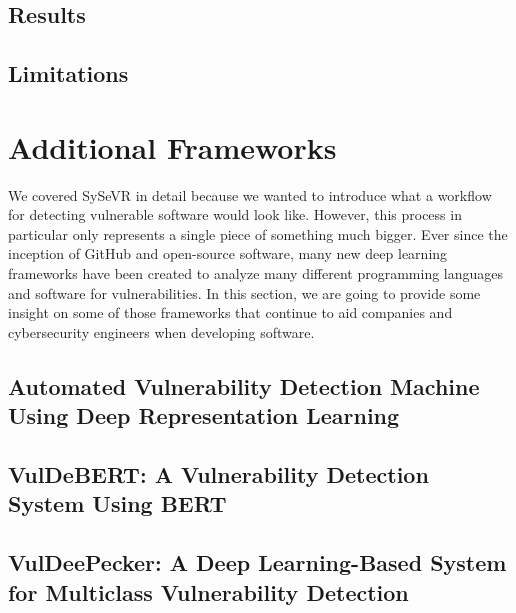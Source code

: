 \documentclass[12pt,twocolumn,letterpaper]{article}
\begin{document}
\subsection{Results}
\label{sub:results}

\subsection{Limitations}
\label{sub:limitations}

\section{Additional Frameworks}
\label{sec:additional-frameworks}

We covered SySeVR in detail because we wanted to introduce what a workflow for detecting vulnerable 
software would look like. However, this process in particular only represents a single piece of something 
much bigger. Ever since the inception of GitHub and open-source software, many new deep learning frameworks have been 
created to analyze many different programming languages and software for vulnerabilities. In this section, 
we are going to provide some insight on some of those frameworks that continue to aid companies and cybersecurity engineers 
when developing software.

\subsection{Automated Vulnerability Detection Machine Using Deep Representation Learning}
\label{sub:automated-vulnerability-detection-machine-using-deep-representation-learning}

\cite{Russell18}

\subsection{VulDeBERT: A Vulnerability Detection System Using BERT}
\label{sub:vuldebert}

\cite{Kim22}

\subsection{VulDeePecker: A Deep Learning-Based System for Multiclass Vulnerability Detection}
\label{sub:vuledeepecker}
\end{document}
